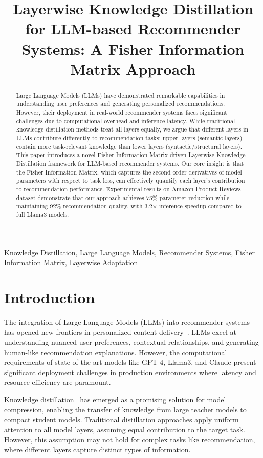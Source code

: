 \documentclass[10pt,conference]{IEEEtran}
\title{Layerwise Knowledge Distillation for LLM-based Recommender Systems: A Fisher Information Matrix Approach}
\author{
\IEEEauthorblockN{Zhaohui Wang\IEEEauthorrefmark{1}}
\IEEEauthorblockA{\IEEEauthorrefmark{1}Institute of Computing Technology\\
Chinese Academy of Sciences\\
Beijing, China\\
Email: wangzhaohui@ict.ac.cn}
}
\begin{document}
\maketitle

\begin{abstract}
Large Language Models (LLMs) have demonstrated remarkable capabilities in understanding user preferences and generating personalized recommendations. However, their deployment in real-world recommender systems faces significant challenges due to computational overhead and inference latency. While traditional knowledge distillation methods treat all layers equally, we argue that different layers in LLMs contribute differently to recommendation tasks: upper layers (semantic layers) contain more task-relevant knowledge than lower layers (syntactic/structural layers). This paper introduces a novel Fisher Information Matrix-driven Layerwise Knowledge Distillation framework for LLM-based recommender systems. Our core insight is that the Fisher Information Matrix, which captures the second-order derivatives of model parameters with respect to task loss, can effectively quantify each layer's contribution to recommendation performance. Experimental results on Amazon Product Reviews dataset demonstrate that our approach achieves 75\% parameter reduction while maintaining 92\% recommendation quality, with 3.2× inference speedup compared to full Llama3 models.
\end{abstract}

\begin{IEEEkeywords}
Knowledge Distillation, Large Language Models, Recommender Systems, Fisher Information Matrix, Layerwise Adaptation
\end{IEEEkeywords}

\section{Introduction}

The integration of Large Language Models (LLMs) into recommender systems has opened new frontiers in personalized content delivery~\cite{zhao2023llm4rec}. LLMs excel at understanding nuanced user preferences, contextual relationships, and generating human-like recommendation explanations. However, the computational requirements of state-of-the-art models like GPT-4, Llama3, and Claude present significant deployment challenges in production environments where latency and resource efficiency are paramount.

Knowledge distillation~\cite{hinton2015distilling} has emerged as a promising solution for model compression, enabling the transfer of knowledge from large teacher models to compact student models. Traditional distillation approaches apply uniform attention to all model layers, assuming equal contribution to the target task. However, this assumption may not hold for complex tasks like recommendation, where different layers capture distinct types of information.
\end{document}

